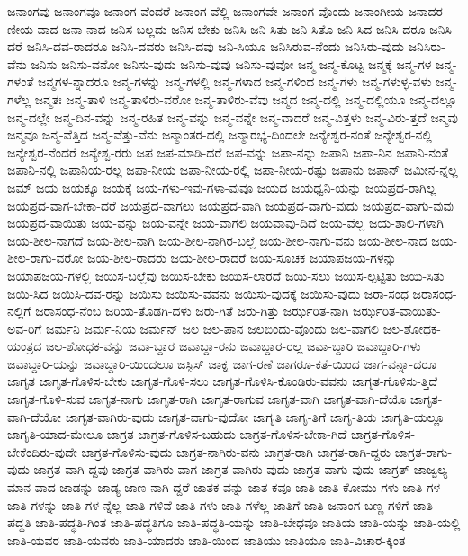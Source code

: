 {ಜನಾಂಗವು
ಜನಾಂಗವೂ
ಜನಾಂಗ-ವೆಂದರೆ
ಜನಾಂಗ-ವೆಲ್ಲಿ
ಜನಾಂಗವೇ
ಜನಾಂಗ-ವೊಂದು
ಜನಾಂಗೀಯ
ಜನಾದರ-ಣೀಯ-ವಾದ
ಜನಾ-ನಾದ
ಜನಿಸ-ಬಲ್ಲದು
ಜನಿಸ-ಬೇಕು
ಜನಿಸಿ
ಜನಿ-ಸಿತು
ಜನಿ-ಸಿತೊ
ಜನಿ-ಸಿದ
ಜನಿಸಿ-ದರೂ
ಜನಿಸಿ-ದರೆ
ಜನಿಸಿ-ದವ-ರಾದರೂ
ಜನಿಸಿ-ದವರು
ಜನಿಸಿ-ದವು
ಜನಿ-ಸಿಯೂ
ಜನಿಸಿರುವ-ನೆಂದು
ಜನಿಸಿರು-ವುದು
ಜನಿಸಿರು-ವೆನು
ಜನಿಸು
ಜನಿಸು-ವನೋ
ಜನಿಸು-ವುದು
ಜನಿಸು-ವುವು
ಜನಿಸು-ವುವೋ
ಜನ್ಮ
ಜನ್ಮ-ಕೊಟ್ಟ
ಜನ್ಮಕ್ಕೆ
ಜನ್ಮ-ಗಳ
ಜನ್ಮ-ಗಳಂತೆ
ಜನ್ಮಗಳ-ನ್ನಾದರೂ
ಜನ್ಮ-ಗಳನ್ನು
ಜನ್ಮ-ಗಳಲ್ಲಿ
ಜನ್ಮ-ಗಳಾದ
ಜನ್ಮ-ಗಳಿಂದ
ಜನ್ಮ-ಗಳು
ಜನ್ಮ-ಗಳುಳ್ಳ-ವಳು
ಜನ್ಮ-ಗಳೆಲ್ಲ
ಜನ್ಮತಃ
ಜನ್ಮ-ತಾಳಿ
ಜನ್ಮ-ತಾಳಿರು-ವರೋ
ಜನ್ಮ-ತಾಳಿರು-ವೆವು
ಜನ್ಮದ
ಜನ್ಮ-ದಲ್ಲಿ
ಜನ್ಮ-ದಲ್ಲಿಯೂ
ಜನ್ಮ-ದಲ್ಲೂ
ಜನ್ಮ-ದಲ್ಲೇ
ಜನ್ಮ-ದಿನ-ವನ್ನು
ಜನ್ಮ-ರಹಿತ
ಜನ್ಮ-ವನ್ನು
ಜನ್ಮ-ವನ್ನೇ
ಜನ್ಮ-ವಾದರೆ
ಜನ್ಮ-ವಿತ್ತಳು
ಜನ್ಮ-ವಿರು-ತ್ತದೆ
ಜನ್ಮವು
ಜನ್ಮವೂ
ಜನ್ಮ-ವೆತ್ತಿದ
ಜನ್ಮ-ವೆತ್ತು-ವೆನು
ಜನ್ಮಾಂತರ-ದಲ್ಲಿ
ಜನ್ಮಾರಭ್ಯ-ದಿಂದಲೇ
ಜನ್ಯೇಶ್ವರ-ನಂತೆ
ಜನ್ಯೇಶ್ವರ-ನಲ್ಲಿ
ಜನ್ಯೇಶ್ವರ-ನೆಂದರೆ
ಜನ್ಯೇಶ್ವ-ರರು
ಜಪ
ಜಪ-ಮಾಡಿ-ದರೆ
ಜಪ-ವನ್ನು
ಜಪಾ-ನನ್ನು
ಜಪಾನಿ
ಜಪಾ-ನಿನ
ಜಪಾನಿ-ನಂತೆ
ಜಪಾನಿ-ನಲ್ಲಿ
ಜಪಾನಿಯ-ರಲ್ಲ
ಜಪಾ-ನೀಯ
ಜಪಾ-ನೀಯ-ರಲ್ಲಿ
ಜಪಾ-ನೀಯ-ರಷ್ಟು
ಜಪಾನು
ಜಪಾನ್
ಜಮೀನ-ನ್ನೆಲ್ಲ
ಜಮ್
ಜಯ
ಜಯಕ್ಕೂ
ಜಯಕ್ಕೆ
ಜಯ-ಗಳು-ಇವು-ಗಳಾ-ವುವೂ
ಜಯದ
ಜಯಧ್ವನಿ-ಯನ್ನು
ಜಯಪ್ರದ-ರಾಗಿಲ್ಲ
ಜಯಪ್ರದ-ವಾಗ-ಬೇಕಾ-ದರೆ
ಜಯಪ್ರದ-ವಾಗಲು
ಜಯಪ್ರದ-ವಾಗಿ
ಜಯಪ್ರದ-ವಾಗು-ವುದು
ಜಯಪ್ರದ-ವಾಗು-ವುವು
ಜಯಪ್ರದ-ವಾಯಿತು
ಜಯ-ವನ್ನು
ಜಯ-ವನ್ನೇ
ಜಯ-ವಾಗಲಿ
ಜಯವಾವು-ದಿದೆ
ಜಯ-ವೆಲ್ಲ
ಜಯ-ಶಾಲಿ-ಗಳಾಗಿ
ಜಯ-ಶೀಲ-ನಾಗದೆ
ಜಯ-ಶೀಲ-ನಾಗಿ
ಜಯ-ಶೀಲ-ನಾಗಿರ-ಬಲ್ಲೆ
ಜಯ-ಶೀಲ-ನಾಗು-ವನು
ಜಯ-ಶೀಲ-ನಾದ
ಜಯ-ಶೀಲ-ರಾಗು-ವರೋ
ಜಯ-ಶೀಲ-ರಾದರು
ಜಯ-ಶೀಲ-ರಾದರೆ
ಜಯ-ಸೂಚಕ
ಜಯಾಪಜಯ-ಗಳನ್ನು
ಜಯಾಪಜಯ-ಗಳಲ್ಲಿ
ಜಯಿಸ-ಬಲ್ಲೆವು
ಜಯಿಸ-ಬೇಕು
ಜಯಿಸ-ಲಾರದೆ
ಜಯಿ-ಸಲು
ಜಯಿಸ-ಲ್ಪಟ್ಟಿತು
ಜಯಿ-ಸಿತು
ಜಯಿ-ಸಿದ
ಜಯಿಸಿ-ದವ-ರನ್ನು
ಜಯಿಸು
ಜಯಿಸು-ವವನು
ಜಯಿಸು-ವುದಕ್ಕೆ
ಜಯಿಸು-ವುದು
ಜರಾ-ಸಂಧ
ಜರಾಸಂಧ-ನಲ್ಲಿಗೆ
ಜರಾಸಂಧ-ನೆಂಬ
ಜರಿಯ-ತೊಡಗಿ-ದಳು
ಜರು-ಗಿತೆ
ಜರು-ಗಿತ್ತು
ಜರ್ಝರಿತ-ನಾಗಿ
ಜರ್ಝರಿತ-ವಾಯಿತು-ಅವ-ರಿಗೆ
ಜರ್ಮನಿ
ಜರ್ಮ-ನಿಯ
ಜರ್ಮನ್
ಜಲ
ಜಲ-ಪಾನ
ಜಲಬಿಂದು-ವೊಂದು
ಜಲ-ವಾಗಲಿ
ಜಲ-ಶೋಧಕ-ಯಂತ್ರದ
ಜಲ-ಶೋಧಕ-ವನ್ನು
ಜವಾ-ಬ್ದಾರ
ಜವಾಬ್ದಾ-ರನು
ಜವಾಬ್ದಾರ-ರಲ್ಲ
ಜವಾ-ಬ್ದಾರಿ
ಜವಾಬ್ದಾರಿ-ಗಳು
ಜವಾಬ್ದಾರಿ-ಯನ್ನು
ಜವಾಬ್ದಾರಿ-ಯಿಂದಲೂ
ಜಸ್ಟಿಸ್
ಜಾಕ್ನ
ಜಾಗ-ರಣೆ
ಜಾಗರೂ-ಕತೆ-ಯಿಂದ
ಜಾಗ-ವನ್ನಾ-ದರೂ
ಜಾಗೃತ
ಜಾಗೃತ-ಗೊಳಿಸ-ಬೇಕು
ಜಾಗೃತ-ಗೊಳಿ-ಸಲು
ಜಾಗೃತ-ಗೊಳಿಸಿ-ಕೊಂಡಿರು-ವವನು
ಜಾಗೃತ-ಗೊಳಿಸು-ತ್ತಿದೆ
ಜಾಗೃತ-ಗೊಳಿ-ಸುವ
ಜಾಗೃತ-ನಾಗು
ಜಾಗೃತ-ರಾಗಿ
ಜಾಗೃತ-ರಾಗುವ
ಜಾಗೃತ-ವಾಗಿ
ಜಾಗೃತ-ವಾಗಿ-ದೆಯೊ
ಜಾಗೃತ-ವಾಗಿ-ದೆಯೋ
ಜಾಗೃತ-ವಾಗಿರು-ವುದು
ಜಾಗೃತ-ವಾಗು-ವುದೋ
ಜಾಗೃತಿ
ಜಾಗೃ-ತಿಗೆ
ಜಾಗೃ-ತಿಯ
ಜಾಗೃತಿ-ಯಲ್ಲೂ
ಜಾಗೃತಿ-ಯಾದ-ಮೇಲೂ
ಜಾಗ್ರತ
ಜಾಗ್ರತ-ಗೊಳಿಸ-ಬಹುದು
ಜಾಗ್ರತ-ಗೊಳಿಸ-ಬೇಕಾ-ಗಿದೆ
ಜಾಗ್ರತ-ಗೊಳಿಸ-ಬೇಕೆಂದಿರು-ವುದೇ
ಜಾಗ್ರತ-ಗೊಳಿಸು-ವುದು
ಜಾಗ್ರತ-ನಾಗಿರು-ವನು
ಜಾಗ್ರತ-ರಾಗಿ
ಜಾಗ್ರತ-ರಾಗಿ-ದ್ದರು
ಜಾಗ್ರತ-ರಾಗು-ವುದು
ಜಾಗ್ರತ-ವಾಗಿ-ದ್ದವು
ಜಾಗ್ರತ-ವಾಗಿರು-ವಾಗ
ಜಾಗ್ರತ-ವಾಗಿರು-ವುದು
ಜಾಗ್ರತ-ವಾಗು-ವುದು
ಜಾಗ್ರತ್
ಜಾಜ್ವಲ್ಯ-ಮಾನ-ವಾದ
ಜಾಡನ್ನು
ಜಾಡ್ಯ
ಜಾಣ-ನಾಗಿ-ದ್ದರೆ
ಜಾತಕ-ವನ್ನು
ಜಾತ-ಕವೂ
ಜಾತಿ
ಜಾತಿ-ಕೋಮು-ಗಳು
ಜಾತಿ-ಗಳ
ಜಾತಿ-ಗಳನ್ನು
ಜಾತಿ-ಗಳ-ನ್ನೆಲ್ಲ
ಜಾತಿ-ಗಳಿವೆ
ಜಾತಿ-ಗಳು
ಜಾತಿ-ಗಳೆಲ್ಲ
ಜಾತಿಗೆ
ಜಾತಿ-ಜನಾಂಗ-ಬಣ್ಣ-ಗಳಿಗೆ
ಜಾತಿ-ಪದ್ಧತಿ
ಜಾತಿ-ಪದ್ಧತಿ-ಗಿಂತ
ಜಾತಿ-ಪದ್ಧತಿಗೂ
ಜಾತಿ-ಪದ್ಧತಿ-ಯನ್ನು
ಜಾತಿ-ಬೇಧವೂ
ಜಾತಿಯ
ಜಾತಿ-ಯನ್ನು
ಜಾತಿ-ಯಲ್ಲಿ
ಜಾತಿ-ಯವರ
ಜಾತಿ-ಯವರು
ಜಾತಿ-ಯಾದರು
ಜಾತಿ-ಯಿಂದ
ಜಾತಿಯು
ಜಾತಿಯೂ
ಜಾತಿ-ವಿಚಾರ-ಕ್ಕಿಂತ
}
